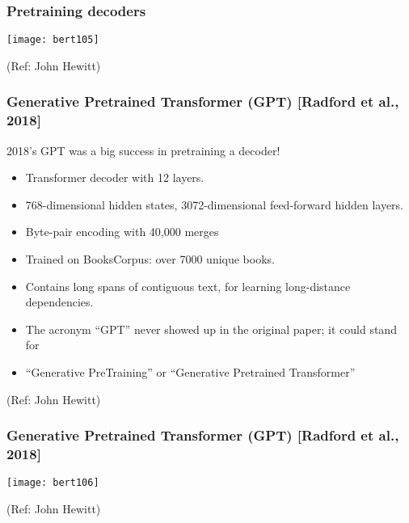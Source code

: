 \begin{frame}[fragile]\frametitle{Pretraining decoders}


			\begin{center}
			\texttt{[image: bert105]}
			\end{center}		
			
			{\tiny (Ref: John Hewitt)}

\end{frame}

\begin{frame}[fragile]\frametitle{Generative Pretrained Transformer (GPT) [Radford et al., 2018]}

2018’s GPT was a big success in pretraining a decoder!


      \begin{itemize}
			\item Transformer decoder with 12 layers.
			\item 768-dimensional hidden states, 3072-dimensional feed-forward hidden layers.
			\item Byte-pair encoding with 40,000 merges
			\item Trained on BooksCorpus: over 7000 unique books.
			\item Contains long spans of contiguous text, for learning long-distance dependencies.
			\item The acronym ``GPT'' never showed up in the original paper; it could stand for
			\item ``Generative PreTraining'' or ``Generative Pretrained Transformer''
			\end{itemize}

			
			{\tiny (Ref: John Hewitt)}

\end{frame}

\begin{frame}[fragile]\frametitle{Generative Pretrained Transformer (GPT) [Radford et al., 2018]}

			\begin{center}
			\texttt{[image: bert106]}
			\end{center}		
			
			{\tiny (Ref: John Hewitt)}

\end{frame}

